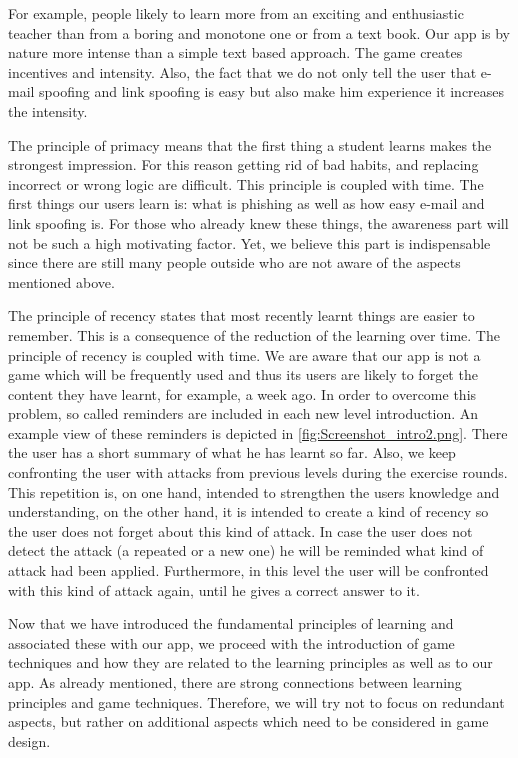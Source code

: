 \begin{description}[leftmargin=0cm]
For example, people likely to learn more from an exciting and enthusiastic teacher than from a boring and monotone one or from a text book.
Our app is by nature more intense than a simple text based approach.
The game creates incentives and intensity.
Also, the fact that we do not only tell the user that e-mail spoofing and link spoofing is easy but also make him experience it increases the intensity.
	\item[Primacy] The principle of primacy means that the first thing a student learns makes the strongest impression. 
For this reason getting rid of bad habits, and replacing incorrect or wrong logic are difficult. 
This principle is coupled with time. 
The first things our users learn is: what is phishing as well as how easy e-mail and link spoofing is. 
For those who already knew these things, the awareness part will not be such a high motivating factor. 
Yet, we believe this part is indispensable since there are still many people outside who are not aware of the aspects mentioned above. 
	\item[Recency] The principle of recency states that most recently learnt things are easier to remember. 
This is a consequence of the reduction of the learning over time. 
The principle of recency is coupled with time. 
We are aware that our app is not a game which will be frequently used and thus its users are likely to forget the content they have learnt, for example, a week ago. 
In order to overcome this problem, so called reminders are included in each new level introduction.
An example view of these reminders is depicted in \autoref{fig:Screenshot_intro2.png}. 
There the user has a short summary of what he has learnt so far. 
Also, we keep confronting the user with attacks from previous levels during the exercise rounds.
This repetition is, on one hand, intended to strengthen the users knowledge and understanding, on the other hand, it is intended to create a kind of recency so the user does not forget about this kind of attack. 
In case the user does not detect the attack (a repeated or a new one) he will be reminded what kind of attack had been applied. 
Furthermore, in this level the user will be confronted with this kind of attack again, until he gives a correct answer to it.
\end{description}
Now that we have introduced the fundamental principles of learning and associated these with our app, we proceed with the introduction of game techniques and how they are related to the learning principles as well as to our app. 
As already mentioned, there are strong connections between learning principles and game techniques. 
Therefore, we will try not to focus on redundant aspects, but rather on additional aspects which need to be considered in game design. 
